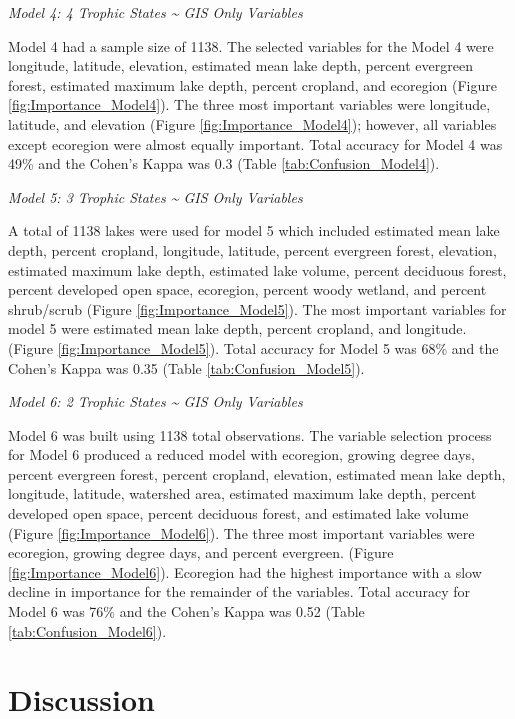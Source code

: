 \documentclass[11pt,]{article}
\begin{document}
\emph{Model 4: 4 Trophic States \textasciitilde{} GIS Only Variables}

Model 4 had a sample size of 1138. The selected variables for the Model
4 were longitude, latitude, elevation, estimated mean lake depth,
percent evergreen forest, estimated maximum lake depth, percent
cropland, and ecoregion (Figure \ref{fig:Importance_Model4}). The three
most important variables were longitude, latitude, and elevation (Figure
\ref{fig:Importance_Model4}); however, all variables except ecoregion
were almost equally important. Total accuracy for Model 4 was 49\% and
the Cohen's Kappa was 0.3 (Table \ref{tab:Confusion_Model4}).

\emph{Model 5: 3 Trophic States \textasciitilde{} GIS Only Variables}

A total of 1138 lakes were used for model 5 which included estimated
mean lake depth, percent cropland, longitude, latitude, percent
evergreen forest, elevation, estimated maximum lake depth, estimated
lake volume, percent deciduous forest, percent developed open space,
ecoregion, percent woody wetland, and percent shrub/scrub (Figure
\ref{fig:Importance_Model5}). The most important variables for model 5
were estimated mean lake depth, percent cropland, and longitude. (Figure
\ref{fig:Importance_Model5}). Total accuracy for Model 5 was 68\% and
the Cohen's Kappa was 0.35 (Table \ref{tab:Confusion_Model5}).

\emph{Model 6: 2 Trophic States \textasciitilde{} GIS Only Variables}

Model 6 was built using 1138 total observations. The variable selection
process for Model 6 produced a reduced model with ecoregion, growing
degree days, percent evergreen forest, percent cropland, elevation,
estimated mean lake depth, longitude, latitude, watershed area,
estimated maximum lake depth, percent developed open space, percent
deciduous forest, and estimated lake volume (Figure
\ref{fig:Importance_Model6}). The three most important variables were
ecoregion, growing degree days, and percent evergreen. (Figure
\ref{fig:Importance_Model6}). Ecoregion had the highest importance with
a slow decline in importance for the remainder of the variables. Total
accuracy for Model 6 was 76\% and the Cohen's Kappa was 0.52 (Table
\ref{tab:Confusion_Model6}).

\section{Discussion}\label{discussion}
\end{document}
